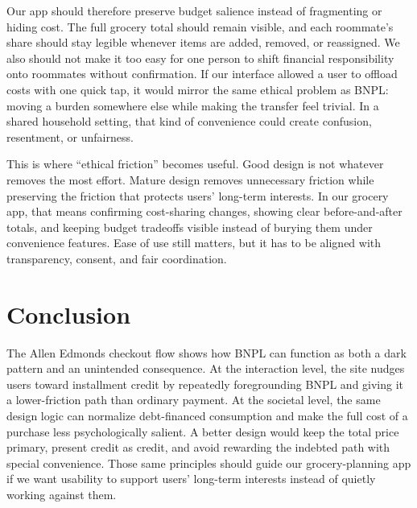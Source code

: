 \documentclass[11pt]{article}
\begin{document}
Our app should therefore preserve budget salience instead of fragmenting or hiding cost. The full grocery total should remain visible, and each roommate's share should stay legible whenever items are added, removed, or reassigned. We also should not make it too easy for one person to shift financial responsibility onto roommates without confirmation. If our interface allowed a user to offload costs with one quick tap, it would mirror the same ethical problem as BNPL: moving a burden somewhere else while making the transfer feel trivial. In a shared household setting, that kind of convenience could create confusion, resentment, or unfairness.

This is where ``ethical friction'' becomes useful. Good design is not whatever removes the most effort. Mature design removes unnecessary friction while preserving the friction that protects users' long-term interests. In our grocery app, that means confirming cost-sharing changes, showing clear before-and-after totals, and keeping budget tradeoffs visible instead of burying them under convenience features. Ease of use still matters, but it has to be aligned with transparency, consent, and fair coordination.

\section{Conclusion}

The Allen Edmonds checkout flow shows how BNPL can function as both a dark pattern and an unintended consequence. At the interaction level, the site nudges users toward installment credit by repeatedly foregrounding BNPL and giving it a lower-friction path than ordinary payment. At the societal level, the same design logic can normalize debt-financed consumption and make the full cost of a purchase less psychologically salient. A better design would keep the total price primary, present credit as credit, and avoid rewarding the indebted path with special convenience. Those same principles should guide our grocery-planning app if we want usability to support users' long-term interests instead of quietly working against them.
\newpage


\end{document}
